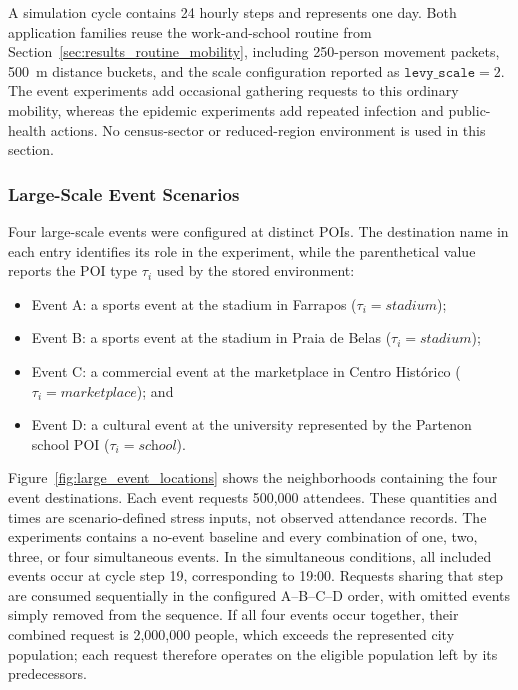 A simulation cycle contains 24 hourly steps and represents one day. Both application families reuse the work-and-school routine from Section~\ref{sec:results_routine_mobility}, including 250-person movement packets, 500~m distance buckets, and the scale configuration reported as $\texttt{levy\_scale}=2$. The event experiments add occasional gathering requests to this ordinary mobility, whereas the epidemic experiments add repeated infection and public-health actions. No census-sector or reduced-region environment is used in this section.


\subsubsection{Large-Scale Event Scenarios}

Four large-scale events were configured at distinct POIs. The destination name in each entry identifies its role in the experiment, while the parenthetical value reports the POI type $\tau_i$ used by the stored environment:

\begin{itemize}
    \item Event A: a sports event at the stadium in Farrapos ($\tau_i=\textit{stadium}$);
    \item Event B: a sports event at the stadium in Praia de Belas ($\tau_i=\textit{stadium}$);
    \item Event C: a commercial event at the marketplace in Centro Hist\'orico ($\tau_i=\textit{marketplace}$); and
    \item Event D: a cultural event at the university represented by the Partenon school POI ($\tau_i=\textit{school}$).
\end{itemize}

Figure~\ref{fig:large_event_locations} shows the neighborhoods containing the four event destinations. Each event requests 500,000 attendees. These quantities and times are scenario-defined stress inputs, not observed attendance records. The experiments contains a no-event baseline and every combination of one, two, three, or four simultaneous events. In the simultaneous conditions, all included events occur at cycle step 19, corresponding to 19:00. Requests sharing that step are consumed sequentially in the configured A--B--C--D order, with omitted events simply removed from the sequence. If all four events occur together, their combined request is 2,000,000 people, which exceeds the represented city population; each request therefore operates on the eligible population left by its predecessors.

